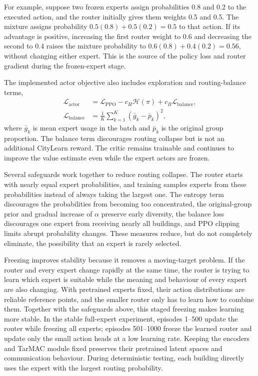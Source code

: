 For example, suppose two frozen experts assign probabilities 0.8 and 0.2 to the
executed action, and the router initially gives them weights 0.5 and 0.5. The
mixture assigns probability $0.5(0.8)+0.5(0.2)=0.5$ to that action. If its
advantage is positive, increasing the first router weight to 0.6 and decreasing
the second to 0.4 raises the mixture probability to
$0.6(0.8)+0.4(0.2)=0.56$, without changing either expert. This is the source of
the policy loss and router gradient during the frozen-expert stage.

The implemented actor objective also includes exploration and routing-balance
terms,
\begin{align}
\mathcal{L}_{\mathrm{actor}}
&=\mathcal{L}_{\mathrm{PPO}}-c_H\mathcal{H}(\pi)
+c_B\mathcal{L}_{\mathrm{balance}},\\
\mathcal{L}_{\mathrm{balance}}
&=\frac{1}{K}\sum_{k=1}^{K}(\bar g_k-\bar p_k)^2,
\end{align}
where $\bar g_k$ is mean expert usage in the batch and $\bar p_k$ is the original
group proportion. The balance term discourages routing collapse but is not an
additional CityLearn reward. The critic remains trainable and continues to
improve the value estimate even while the expert actors are frozen.

Several safeguards work together to reduce routing collapse. The router starts
with nearly equal expert probabilities, and training samples experts from these
probabilities instead of always taking the largest one. The entropy term
discourages the probabilities from becoming too concentrated, the original-group
prior and gradual increase of $\alpha$ preserve early diversity, the balance loss
discourages one expert from receiving nearly all buildings, and PPO clipping
limits abrupt probability changes. These measures reduce, but do not completely
eliminate, the possibility that an expert is rarely selected.

Freezing improves stability because it removes a moving-target problem. If the
router and every expert change rapidly at the same time, the router is trying to
learn which expert is suitable while the meaning and behaviour of every expert
are also changing. With pretrained experts fixed, their action distributions are
reliable reference points, and the smaller router only has to learn how to combine
them. Together with the safeguards above, this staged freezing makes learning
more stable. In the stable full-expert experiment, episodes 1--500 update the
router while freezing all experts;
episodes 501--1000 freeze the learned router and update only the small action
heads at a low learning rate. Keeping the encoders and TarMAC module fixed
preserves their pretrained latent spaces and communication behaviour. During
deterministic testing, each building directly uses the expert with the largest
routing probability.


